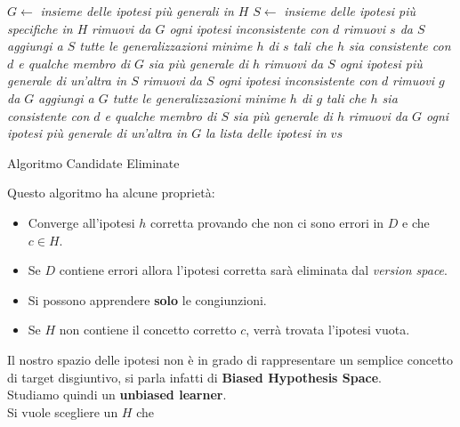 \begin{algorithm}[H]
  \begin{algorithmic}
    \State $G\gets$ \textit{insieme delle ipotesi più generali in $H$}
    \State $S\gets$ \textit{insieme delle ipotesi più specifiche in $H$}
    \State \textit{rimuovi da $G$ ogni ipotesi inconsistente con $d$}
    \State \textit{rimuovi $s$ da $S$}
    \State
    \State \textit{aggiungi a $S$ tutte le generalizzazioni minime $h$ di $s$}
    \State \textit{tali che $h$ sia consistente con $d$ e qualche membro di $G$}
    \State \textit{sia più generale di $h$}
    \EndFor
    \State \textit{rimuovi da $S$ ogni ipotesi più generale di un'altra in $S$}
    \Else
    \State \textit{rimuovi da $S$ ogni ipotesi inconsistente con $d$}
    \State \textit{rimuovi $g$ da $G$}
    \State
    \State \textit{aggiungi a $G$ tutte le generalizzazioni minime $h$ di $g$}
    \State \textit{tali che $h$ sia consistente con $d$ e qualche membro di $S$}
    \State \textit{sia più generale di $h$}
    \EndFor
    \State \textit{rimuovi da $G$ ogni ipotesi più generale di un'altra in $G$}
    \EndIf
    \EndFor
    \Return \textit{la lista delle ipotesi in $vs$}
    \EndFunction
  \end{algorithmic}
  \caption{Algoritmo Candidate Eliminate}
\end{algorithm}
Questo algoritmo ha alcune proprietà:
\begin{itemize}
  \item Converge all'ipotesi $h$ corretta provando che non ci sono errori in $D$
  e che $c\in H$.
  \item Se $D$ contiene errori allora l'ipotesi corretta sarà eliminata dal
  \textit{version space}.
  \item Si possono apprendere \textbf{solo} le congiunzioni.
  \item Se $H$ non contiene il concetto corretto $c$, verrà trovata l'ipotesi
  vuota.
\end{itemize}
Il nostro spazio delle ipotesi non è in grado di rappresentare un semplice
concetto di target disgiuntivo, si parla infatti di \textbf{Biased Hypothesis
  Space}. \\
Studiamo quindi un \textbf{unbiased learner}.\\Si vuole scegliere un $H$ che
